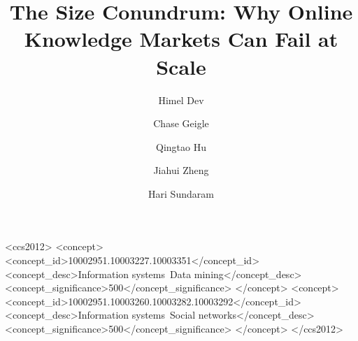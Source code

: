 \documentclass[sigconf]{acmart}
\begin{document}
\title[The Size Conundrum]{The Size Conundrum: Why Online Knowledge Markets Can Fail at Scale}


\author{Himel Dev}

\author{Chase Geigle}

\author{Qingtao Hu}

\author{Jiahui Zheng}

\author{Hari Sundaram}

\renewcommand{\shortauthors}{H. Dev et al.}



%
%
\begin{CCSXML}
<ccs2012>
<concept>
<concept_id>10002951.10003227.10003351</concept_id>
<concept_desc>Information systems~Data mining</concept_desc>
<concept_significance>500</concept_significance>
</concept>
<concept>
<concept_id>10002951.10003260.10003282.10003292</concept_id>
<concept_desc>Information systems~Social networks</concept_desc>
<concept_significance>500</concept_significance>
</concept>
</ccs2012>
\end{CCSXML}





\maketitle











\balance



\end{document}
